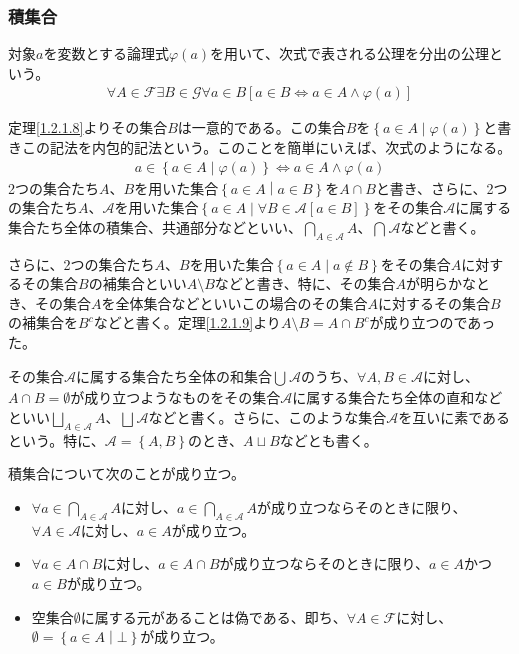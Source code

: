 \documentclass[a4paper]{jsarticle}
\begin{document}
\subsubsection{積集合}%
\begin{axs*}
対象$a$を変数とする論理式$\varphi(a)$を用いて、次式で表される公理を分出の公理という。
\begin{align*}
\forall A\in \mathcal{F\exists}B \in \mathcal{G\forall}a \in B\left[ a \in B \Leftrightarrow a \in A \land \varphi(a) \right]
\end{align*}
\end{axs*}
定理\ref{1.2.1.8}よりその集合$B$は一意的である。この集合$B$を$\left\{ a \in A \middle| \varphi(a) \right\}$と書きこの記法を内包的記法という。このことを簡単にいえば、次式のようになる。
\begin{align*}
a \in \left\{ a \in A \middle| \varphi(a) \right\} \Leftrightarrow a \in A \land \varphi(a)
\end{align*}
2つの集合たち$A$、$B$を用いた集合$\left\{ a \in A \middle| a \in B \right\}$を$A \cap B$と書き、さらに、2つの集合たち$A$、$\mathcal{A}$を用いた集合$\left\{ a \in A \middle| \forall B\in \mathcal{A}[ a \in B] \right\}$をその集合$\mathcal{A}$に属する集合たち全体の積集合、共通部分などといい、$\bigcap_{A \in \mathcal{A}} A$、$\bigcap_{} \mathcal{A}$などと書く。\par
さらに、2つの集合たち$A$、$B$を用いた集合$\left\{ a \in A \middle| a \notin B \right\}$をその集合$A$に対するその集合$B$の補集合といい$A \setminus B$などと書き、特に、その集合$A$が明らかなとき、その集合$A$を全体集合などといいこの場合のその集合$A$に対するその集合$B$の補集合を$B^{c}$などと書く。定理\ref{1.2.1.9}より$A \setminus B = A \cap B^{c}$が成り立つのであった。\par
その集合$\mathcal{A}$に属する集合たち全体の和集合$\bigcup_{} \mathcal{A}$のうち、$\forall A,B \in \mathcal{A}$に対し、$A \cap B = \emptyset$が成り立つようなものをその集合$\mathcal{A}$に属する集合たち全体の直和などといい$\bigsqcup_{A \in \mathcal{A}} A$、$\bigsqcup_{} \mathcal{A}$などと書く。さらに、このような集合$\mathcal{A}$を互いに素であるという。特に、$\mathcal{A} =\left\{ A,B \right\}$のとき、$A \sqcup B$などとも書く。
\begin{thm*}
積集合について次のことが成り立つ。
\begin{itemize}
\item
  $\forall a \in \bigcap_{A \in \mathcal{A}} A$に対し、$a \in \bigcap_{A \in \mathcal{A}} A$が成り立つならそのときに限り、$\forall A \in \mathcal{A}$に対し、$a \in A$が成り立つ。
\item
  $\forall a \in A \cap B$に対し、$a \in A \cap B$が成り立つならそのときに限り、$a \in A$かつ$a \in B$が成り立つ。
\item
  空集合$\emptyset$に属する元があることは偽である、即ち、$\forall A\in \mathcal{F}$に対し、$\emptyset = \left\{ a \in A \middle| \bot \right\}$が成り立つ。
\end{itemize}
\end{thm*}
\end{document}
